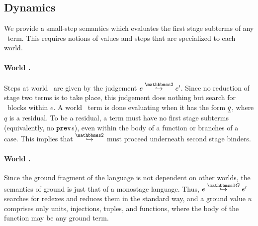 \subsection{Dynamics}
\label{sec:dynamics}



We provide a small-step semantics which evaluates the first stage subterms
of any \lang\ term.  
This requires notions of values and steps that are specialized to each world.

\paragraph{World \bbtwo.} Steps at world \bbtwo\ are given by the judgement $\steptwo e {e'}$.
Since no reduction of stage two terms is to take place, this judgement does nothing but search for \prev\ blocks within $e$.
A world \bbtwo\ term is done evaluating when it has the form $\underline{q}$, where $q$ is a residual. 
To be a residual, a term must have no first stage subterms (equivalently, no ${\tt prev}$s), even within the body of a function or branches of a case.
This implies that $\stepsym \bbtwo$ must proceed underneath second stage binders.

\paragraph{World \bbonep.} Since the ground fragment of the language is not dependent on other worlds, the semantics of ground is just that of a monostage language.
Thus, $\steppure e {e'}$ searches for redexes and reduces them in the standard way, and a ground value $u$ comprises only units, injections, tuples, and functions, where the body of the function may be any ground term.

